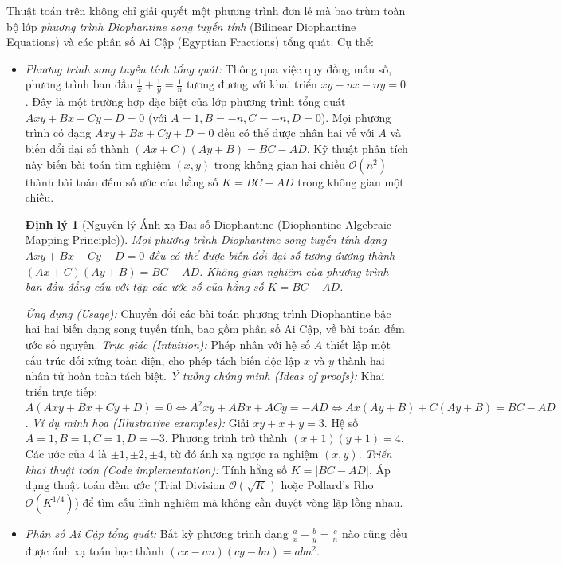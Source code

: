 \documentclass{article}
\newtheorem{dinhly}{Định lý}
\begin{document}
Thuật toán trên không chỉ giải quyết một phương trình đơn lẻ mà bao trùm toàn bộ lớp \textit{phương trình Diophantine song tuyến tính} (Bilinear Diophantine Equations) và các phân số Ai Cập (Egyptian Fractions) tổng quát. Cụ thể:
\begin{itemize}
 \item \textit{Phương trình song tuyến tính tổng quát:} Thông qua việc quy đồng mẫu số, phương trình ban đầu $\frac{1}{x} + \frac{1}{y} = \frac{1}{n}$ tương đương với khai triển $xy - nx - ny = 0$. Đây là một trường hợp đặc biệt của lớp phương trình tổng quát $Axy + Bx + Cy + D = 0$ (với $A=1, B=-n, C=-n, D=0$). Mọi phương trình có dạng $Axy + Bx + Cy + D = 0$ đều có thể được nhân hai vế với $A$ và biến đổi đại số thành $(Ax + C)(Ay + B) = BC - AD$. Kỹ thuật phân tích này biến bài toán tìm nghiệm $(x,y)$ trong không gian hai chiều $\mathcal{O}(n^2)$ thành bài toán đếm số ước của hằng số $K = BC - AD$ trong không gian một chiều.
 
\begin{dinhly}[Nguyên lý Ánh xạ Đại số Diophantine (Diophantine Algebraic Mapping Principle)]
    Mọi phương trình Diophantine song tuyến tính dạng $Axy + Bx + Cy + D = 0$ đều có thể được biến đổi đại số tương đương thành $(Ax + C)(Ay + B) = BC - AD$. Không gian nghiệm của phương trình ban đầu đẳng cấu với tập các ước số của hằng số $K = BC - AD$.
\end{dinhly}
\emph{Ứng dụng (Usage):} Chuyển đổi các bài toán phương trình Diophantine bậc hai hai biến dạng song tuyến tính, bao gồm phân số Ai Cập, về bài toán đếm ước số nguyên.
\emph{Trực giác (Intuition):} Phép nhân với hệ số $A$ thiết lập một cấu trúc đối xứng toàn diện, cho phép tách biến độc lập $x$ và $y$ thành hai nhân tử hoàn toàn tách biệt.
\emph{Ý tưởng chứng minh (Ideas of proofs):} Khai triển trực tiếp: $A(Axy + Bx + Cy + D) = 0 \iff A^2 xy + ABx + ACy = -AD \iff Ax(Ay+B) + C(Ay+B) = BC-AD$.
\emph{Ví dụ minh họa (Illustrative examples):} Giải $xy + x + y = 3$. Hệ số $A=1, B=1, C=1, D=-3$. Phương trình trở thành $(x+1)(y+1) = 4$. Các ước của 4 là $\pm 1, \pm 2, \pm 4$, từ đó ánh xạ ngược ra nghiệm $(x,y)$.
\emph{Triển khai thuật toán (Code implementation):} Tính hằng số $K = |BC - AD|$. Áp dụng thuật toán đếm ước (Trial Division $\mathcal{O}(\sqrt{K})$ hoặc Pollard's Rho $\mathcal{O}(K^{1/4})$) để tìm cấu hình nghiệm mà không cần duyệt vòng lặp lồng nhau.
 \item \textit{Phân số Ai Cập tổng quát:} Bất kỳ phương trình dạng $\frac{a}{x} + \frac{b}{y} = \frac{c}{n}$ nào cũng đều được ánh xạ toán học thành $(cx - an)(cy - bn) = abn^2$.
\end{itemize}
\end{document}
